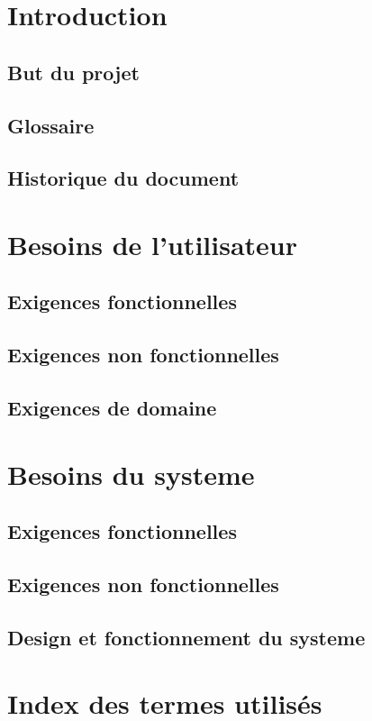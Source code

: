 \documentclass[11pt,a4paper]{article}
\begin{document}
    
    \pagestyle{empty}
\tableofcontents
\newpage
\pagestyle{fancy}

\setcounter{page}{1}

\section{Introduction}
\label{sec:intro}

\subsection{But du projet}
\label{sec:but}

\subsection{Glossaire}
\label{sec:glo}

\subsection{Historique du document}
\label{sec:hist}

\section{Besoins de l'utilisateur}
\label{sec:besoins}

\subsection{Exigences fonctionnelles}
\label{sec:exi-fonc}

\subsection{Exigences non fonctionnelles}
\label{sec:exi-nonfonc}

\subsection{Exigences de domaine}
\label{sec:exi-dom}

\section{Besoins du systeme}
\label{sec:besoins-sys}

\subsection{Exigences fonctionnelles}
\label{sec:exi-fonc-sys}

\subsection{Exigences non fonctionnelles}
\label{sec:exi-nonfonc-sys}

\subsection{Design et fonctionnement du systeme}
\label{sec:design}


\appendix

\section{Index des termes utilisés}
\label{sec:index}
\end{document}
